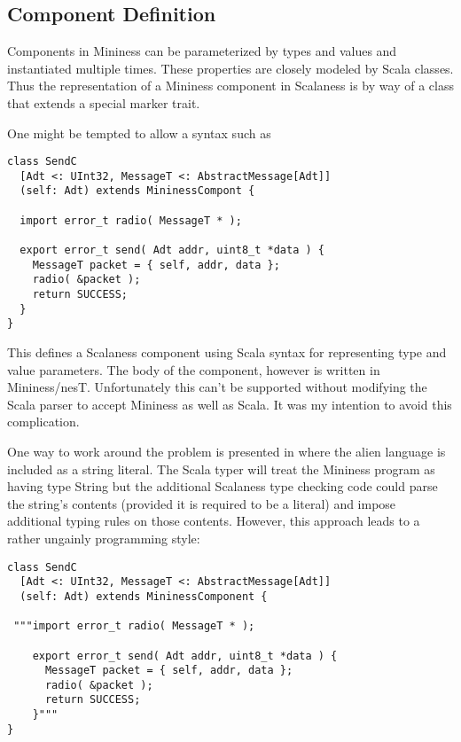 \subsection{Component Definition}
\label{section-component-definition}

Components in Mininess can be parameterized by types and values and instantiated multiple times.
These properties are closely modeled by Scala classes. Thus the representation of a Mininess
component in Scalaness is by way of a class that extends a special marker trait.

One might be tempted to allow a syntax such as

\singlespace
\begin{lstlisting}[language=scalaness]
class SendC
  [Adt <: UInt32, MessageT <: AbstractMessage[Adt]]
  (self: Adt) extends MininessCompont {

  import error_t radio( MessageT * );

  export error_t send( Adt addr, uint8_t *data ) {
    MessageT packet = { self, addr, data };
    radio( &packet );
    return SUCCESS;
  }
}
\end{lstlisting}
\primaryspacing

This defines a Scalaness component using Scala syntax for representing type and value
parameters. The body of the component, however is written in Mininess/nesT. Unfortunately this
can't be supported without modifying the Scala parser to accept Mininess as well as Scala. It
was my intention to avoid this complication.

One way to work around the problem is presented in \cite{Garcia-Scala-Query} where the alien
language is included as a string literal. The Scala typer will treat the Mininess program as
having type String but the additional Scalaness type checking code could parse the string's
contents (provided it is required to be a literal) and impose additional typing rules on those
contents. However, this approach leads to a rather ungainly programming style:

\singlespace
\begin{lstlisting}[language=scalaness]
class SendC
  [Adt <: UInt32, MessageT <: AbstractMessage[Adt]]
  (self: Adt) extends MininessComponent {

 """import error_t radio( MessageT * );

    export error_t send( Adt addr, uint8_t *data ) {
      MessageT packet = { self, addr, data };
      radio( &packet );
      return SUCCESS;
    }"""
}
\end{lstlisting}
\primaryspacing

